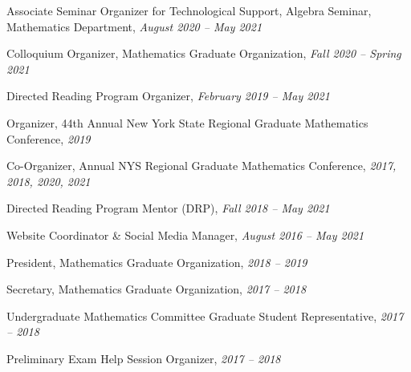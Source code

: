 

\begin{enumDiamond}[itemsep=0.1cm]
\item Associate Seminar Organizer for Technological Support, Algebra Seminar, Mathematics Department, {\itshape August 2020 -- May 2021}
\item Colloquium Organizer, Mathematics Graduate Organization, {\itshape Fall 2020 -- Spring 2021}
\item Directed Reading Program Organizer, {\itshape February 2019 -- May 2021} 
\item Organizer, 44th Annual New York State Regional Graduate Mathematics Conference, {\itshape 2019}
\item Co-Organizer, Annual NYS Regional Graduate Mathematics Conference, {\itshape 2017, 2018, 2020, 2021}
\item Directed Reading Program Mentor (DRP), {\itshape Fall 2018 -- May 2021}
\item Website Coordinator \& Social Media Manager, {\itshape August 2016 -- May 2021}
\item President, Mathematics Graduate Organization, {\itshape 2018 -- 2019}
\item Secretary, Mathematics Graduate Organization, {\itshape 2017 -- 2018}
\item Undergraduate Mathematics Committee Graduate Student Representative, {\itshape 2017 -- 2018} 
\item Preliminary Exam Help Session Organizer, {\itshape 2017 -- 2018}
 \end{enumDiamond} \twomedskip\twomedskip






